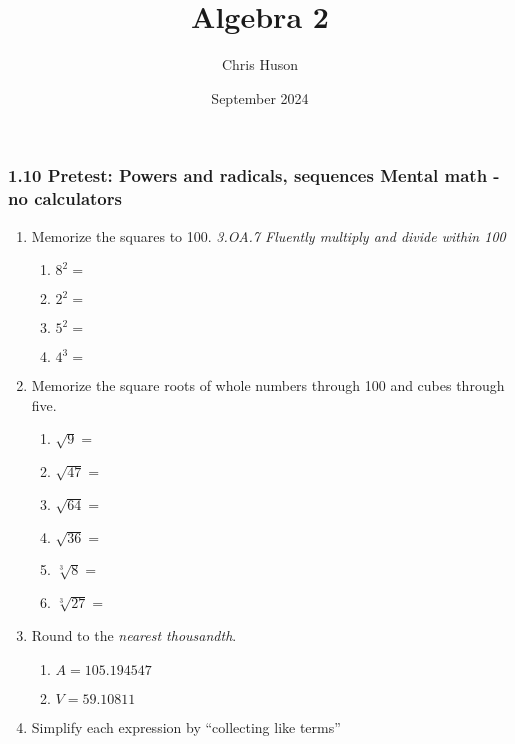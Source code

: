 \documentclass[12pt, twoside]{article}
\title{Algebra 2}
\author{Chris Huson}
\date{September 2024}
\begin{document}
\subsubsection*{1.10 Pretest: Powers and radicals, sequences \hfill Mental math - no calculators}
\begin{enumerate}[itemsep=0.5cm]

\item Memorize the squares to 100. \hfill \emph{3.OA.7 Fluently multiply and divide within 100}
    \begin{multicols}{2}
        \begin{enumerate}[itemsep=0.5cm]
            \item $8^2 =$
            \item $2^2 =$
            \item $5^2 =$
            \item $4^3 =$
        \end{enumerate}
    \end{multicols}

\item Memorize the square roots of whole numbers through 100 and cubes through five.
    \begin{multicols}{2}
        \begin{enumerate}[itemsep=0.5cm]
            \item $\sqrt{9} =$
            \item $\sqrt{47} =$
            \item $\sqrt{64} =$
            \item $\sqrt{36} =$
            \item $\sqrt[3]{8} =$
            \item $\sqrt[3]{27} =$
          \end{enumerate}
    \end{multicols}

\item Round to the \emph{nearest thousandth}.
  \begin{multicols}{2}
  \begin{enumerate}[itemsep=1.5cm]
    \item $A=105.194547$
    \item $V=59.10811$
  \end{enumerate}
  \end{multicols} \vspace{0.5cm}

\item Simplify each expression by ``collecting like terms''
\begin{enumerate}[itemsep=2cm]
  \end{enumerate} \vspace{1cm}


\end{enumerate}
\end{document}
